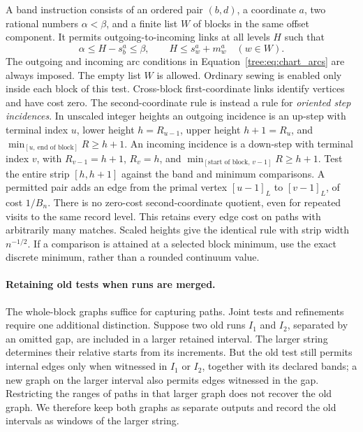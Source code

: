 A band instruction consists of an ordered pair $(b,d)$, a coordinate
$a$, two rational numbers $\alpha<\beta$, and a finite list $W$ of
blocks in the same offset component.  It permits outgoing-to-incoming
links at all levels $H$ such that
\begin{equation}\label{tree:eq:band_instruction}
 \alpha\leq H-s_b^a\leq\beta,
 \qquad H\leq s_w^a+m_w^a\quad(w\in W).
\end{equation}
The outgoing and incoming arc conditions in
Equation~\eqref{tree:eq:chart_arcs} are always imposed.  The empty list $W$
is allowed. Ordinary sewing is enabled only inside each block of this
test. Cross-block first-coordinate links
identify vertices and have cost zero.  The second-coordinate rule is
instead a rule for \emph{oriented step incidences}.  In unscaled integer
heights an outgoing incidence is an up-step with terminal index $u$,
lower height $h=R_{u-1}$, upper height $h+1=R_u$, and
$\min_{[u,\,\text{end of block}]}R\geq h+1$.  An incoming incidence
is a down-step with terminal index $v$, with $R_{v-1}=h+1$, $R_v=h$,
and $\min_{[\text{start of block},\,v-1]}R\geq h+1$.
Test the entire strip $[h,h+1]$ against the band and minimum comparisons.
A permitted pair adds an edge from the primal vertex $[u-1]_L$ to
$[v-1]_L$, of cost $1/B_n$.  There is no zero-cost second-coordinate
quotient, even for repeated visits to the same record level.  This
retains every edge cost on paths with arbitrarily many matches.
Scaled heights give the identical rule with strip width $n^{-1/2}$.
If a comparison is attained at a selected block minimum, use the
exact discrete minimum, rather than a rounded continuum value.

\paragraph{Retaining old tests when runs are merged.}
The whole-block graphs suffice for capturing paths. Joint tests and
refinements require one additional distinction. Suppose two old runs
$I_1$ and $I_2$, separated by an omitted gap, are included in a larger
retained interval. The larger string determines their relative starts
from its increments. But the old test still permits internal edges
only when witnessed in $I_1$ or $I_2$, together with its declared bands;
a new graph on the larger interval also permits edges witnessed in the
gap. Restricting the ranges of paths in that larger graph does not
recover the old graph. We therefore keep both graphs as separate
outputs and record the old intervals as windows of the larger string.

